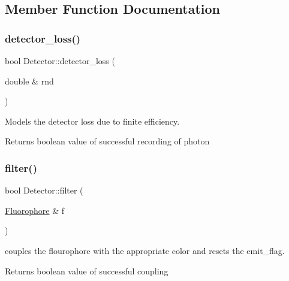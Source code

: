 \subsection{Member Function Documentation}
\mbox{\label{classDetector_a51d97a31b186129a7aac2b250352f22e}} 
\subsubsection{\texorpdfstring{detector\+\_\+loss()}{detector\_loss()}}
{\footnotesize\ttfamily bool Detector\+::detector\+\_\+loss (\begin{DoxyParamCaption}\item[{double \&}]{rnd }\end{DoxyParamCaption})\hspace{0.3cm}{\ttfamily [inline]}}



Models the detector loss due to finite efficiency. 

\begin{DoxyReturn}{Returns}
boolean value of successful recording of photon 
\end{DoxyReturn}
\mbox{\label{classDetector_aafefda7f530ec8646d1591d7c019d72b}} 
\subsubsection{\texorpdfstring{filter()}{filter()}}
{\footnotesize\ttfamily bool Detector\+::filter (\begin{DoxyParamCaption}\item[{\hyperlink{classFluorophore}{Fluorophore} \&}]{f }\end{DoxyParamCaption})\hspace{0.3cm}{\ttfamily [inline]}}



couples the flourophore with the appropriate color and resets the emit\+\_\+flag. 

\begin{DoxyReturn}{Returns}
boolean value of successful coupling 
\end{DoxyReturn}
\mbox{\label{classDetector_ae1b633f64a917029a0915c885eebd9a3}} 
